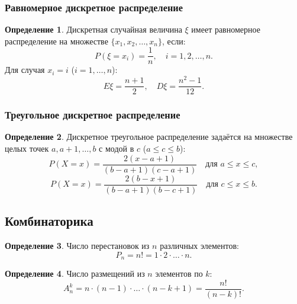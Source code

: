 \documentclass[a4paper]{article}
\theoremstyle{definition}
\newtheorem{definition}{Определение}[subsection]
\begin{document}
\subsubsection{Равномерное дискретное распределение}

\begin{definition}
Дискретная случайная величина $\xi$ имеет равномерное распределение на множестве $\{x_1, x_2, \dots, x_n\}$, если:
\begin{equation}
    P(\xi = x_i) = \frac{1}{n}, \quad i = 1, 2, \dots, n. \tag{25}
\end{equation}
Для случая $x_i = i$ ($i = 1, \dots, n$):
\begin{equation}
    E\xi = \frac{n + 1}{2}, \quad D\xi = \frac{n^2 - 1}{12}. \tag{26}
\end{equation}
\end{definition}

\subsubsection{Треугольное дискретное распределение}

\begin{definition}
Дискретное треугольное распределение задаётся на множестве целых точек $a, a+1, \dots, b$ с модой в $c$ ($a \le c \le b$):
\begin{equation}
    P(X = x) = \frac{2(x - a + 1)}{(b - a + 1)(c - a + 1)} \quad \text{для } a \le x \le c, \tag{27}
\end{equation}
\begin{equation}
    P(X = x) = \frac{2(b - x + 1)}{(b - a + 1)(b - c + 1)} \quad \text{для } c \le x \le b. \tag{28}
\end{equation}
\end{definition}

\subsection{Комбинаторика}

\begin{definition}
Число перестановок из $n$ различных элементов:
\begin{equation}
    P_n = n! = 1 \cdot 2 \cdot \dots \cdot n. \tag{29}
\end{equation}
\end{definition}

\begin{definition}
Число размещений из $n$ элементов по $k$:
\begin{equation}
    A_n^k = n \cdot (n - 1) \cdot \dots \cdot (n - k + 1) = \frac{n!}{(n - k)!}. \tag{30}
\end{equation}
\end{definition}
\end{document}

